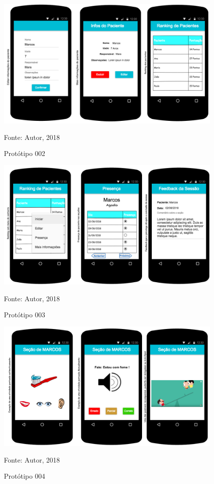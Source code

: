 \documentclass[
	12pt,				%
	openright,			%
	oneside,			%
	a4paper,			%
	english,			%
	brazil				%
	]{abntex2}
\theoremstyle{theorem}
\theoremstyle{definition}
\begin{document}
	\begin{figure}[H]
		\centering
		\includegraphics[width=1\linewidth]{img/editarpacientemaisinfopacienterankingpacientes}
		\caption{Protótipo 002}
		Fonte: Autor, 2018
		\label{p002}
	\end{figure}

	\begin{figure}[H]
	\centering
		\includegraphics[width=1\linewidth]{img/rankingmenucontextopresenadopaciente}
		\caption{Protótipo 003}
		Fonte: Autor, 2018
		\label{p003}
	\end{figure}

	\begin{figure}[H]
		\centering
		\includegraphics[width=1\linewidth]{img/exemplopontuaoautomaticaexemplopontuaomanualreconpensa}
		\caption{Protótipo 004}
		Fonte: Autor, 2018
		\label{p004}
	\end{figure}
\end{document}
